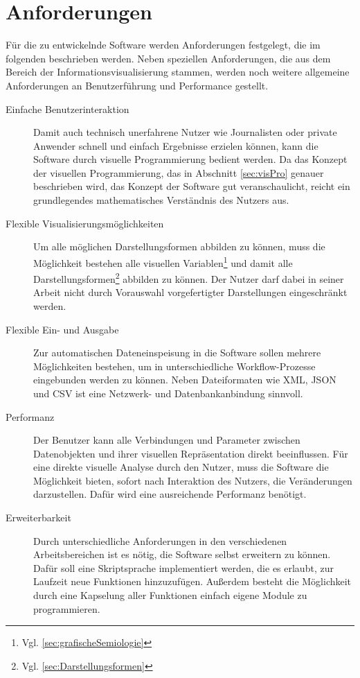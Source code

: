\documentclass[a4paper, 12pt, DIVcalc, onepage, pdftex, headsepline, footsepline]{scrreprt}
\begin{document}
\section{Anforderungen}
\label{sec:Anforderungen}
Für die zu entwickelnde Software werden Anforderungen festgelegt, die
im folgenden beschrieben werden. Neben speziellen Anforderungen, die aus
dem Bereich der Informationsvisualisierung stammen, werden noch weitere
allgemeine Anforderungen an Benutzerführung und Performance gestellt.
\begin{description}
\item[Einfache Benutzerinteraktion]
Damit auch technisch unerfahrene Nutzer wie Journalisten oder private
Anwender schnell und einfach Ergebnisse erzielen können, kann die Software
durch visuelle Programmierung bedient werden. Da das Konzept der visuellen
Programmierung, das in Abschnitt \ref{sec:visPro} genauer beschrieben wird,
das Konzept der Software gut veranschaulicht, reicht ein grundlegendes
mathematisches Verständnis des Nutzers aus.
\item[Flexible Visualisierungsmöglichkeiten]
Um alle möglichen Darstellungsformen abbilden zu können, muss die 
Möglichkeit bestehen alle visuellen Variablen\footnote{Vgl.
\ref{sec:grafischeSemiologie}} und damit alle Darstellungsformen\footnote{Vgl.
\ref{sec:Darstellungsformen}} abbilden zu können. Der Nutzer darf dabei
in seiner Arbeit nicht durch Vorauswahl vorgefertigter Darstellungen
eingeschränkt werden.
\item[Flexible Ein- und Ausgabe]
Zur automatischen Dateneinspeisung in die Software sollen mehrere Möglichkeiten
bestehen, um in unterschiedliche Workflow-Prozesse eingebunden werden zu können.
Neben Dateiformaten wie XML, JSON und CSV ist eine Netzwerk- und
Datenbankanbindung sinnvoll.
\item[Performanz]
Der Benutzer kann alle Verbindungen und Parameter zwischen Datenobjekten und ihrer
visuellen Repräsentation direkt beeinflussen. Für eine direkte visuelle Analyse
durch den Nutzer, muss die Software die Möglichkeit bieten, sofort
nach Interaktion des Nutzers, die Veränderungen darzustellen. Dafür wird eine
ausreichende Performanz benötigt.
\item[Erweiterbarkeit]
Durch unterschiedliche Anforderungen in den verschiedenen Arbeitsbereichen ist
es nötig, die Software selbst erweitern zu können. Dafür soll eine Skriptsprache
implementiert werden, die es erlaubt, zur Laufzeit neue Funktionen hinzuzufügen.
Außerdem besteht die Möglichkeit durch eine Kapselung aller Funktionen
einfach eigene Module zu programmieren.

\end{description}
\end{document}
